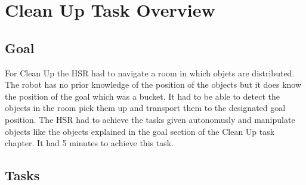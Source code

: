 \documentclass[main.tex]{subfiles}
\begin{document}
	\begingroup

	\renewcommand{\cleardoublepage}{}

	\renewcommand{\clearpage}{}

	\chapter{Clean Up Task Overview}

		
		\section{Goal}
		For Clean Up the HSR had to navigate a room in which objets are distributed. The robot has no prior knowledge of the position of the objects but it does know the position of the goal which was a bucket. It had to be able to detect the objects in the room pick them up and transport them to the designated goal position. The HSR had to achieve the tasks given autonomusly and manipulate objects like the objects explained in the goal section of the Clean Up task chapter. It had 5 minutes to achieve this task.
		

	  	\section{Tasks}
\end{document}
